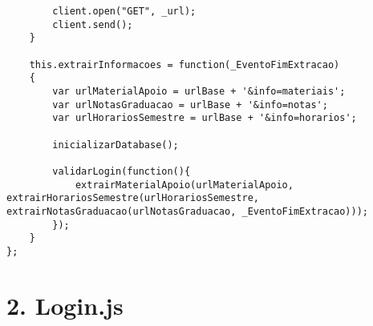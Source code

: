 \begin{lstlisting}
		client.open("GET", _url);
 		client.send();  
 	}
 	
 	this.extrairInformacoes = function(_EventoFimExtracao)
 	{
 		var urlMaterialApoio = urlBase + '&info=materiais';
 		var urlNotasGraduacao = urlBase + '&info=notas';
 		var urlHorariosSemestre = urlBase + '&info=horarios';
 		
 		inicializarDatabase();

 		validarLogin(function(){
 			extrairMaterialApoio(urlMaterialApoio, extrairHorariosSemestre(urlHorariosSemestre, extrairNotasGraduacao(urlNotasGraduacao, _EventoFimExtracao)));
 		});
 	}
};
\end{lstlisting}

\section*{2. Login.js}
